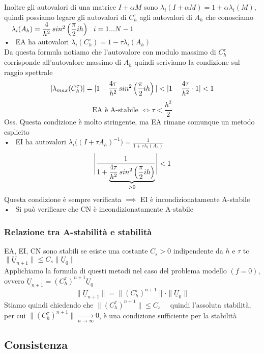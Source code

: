\documentclass{article}
\renewcommand{\vv}[1]{\underline{#1}}
\begin{document}
Inoltre gli autovalori di una matrice $I+\alpha M$ sono $\lambda_i(I+\alpha M)=1+\alpha \lambda_i(M)$, quindi possiamo legare gli autovalori di $C_h^{\tau}$ agli autovalori di $A_h$ che conosciamo \ \ $\lambda_i(A_h)=\dfrac{4}{h^2}\,sin^2\left(\dfrac{\pi}{2}ih\right) \ \ i=1...N-1$\\

• \ EA ha autovalori $\lambda_i(C_h^{\tau})=1-\tau\lambda_i(A_h)$\\
Da questa formula notiamo che l'autovalore con modulo massimo di $C_h^{\tau}$ corrisponde all'autovalore massimo di $A_h$ quindi scriviamo la condizione sul raggio spettrale
\[
|\lambda_{max}(C_h^{\tau})|=|1-\frac{4\tau}{h^2}\,sin^2\O\frac{\pi}{2}ih\C|<|1-\frac{4\tau}{h^2}\cdot 1|<1
\]
\[
\text{EA è A-stabile } \Longleftrightarrow \tau < \frac{h^2}{2}
\]
Oss. Questa condizione è molto stringente, ma EA rimane comunque un metodo esplicito\\


• \ EI ha autovalori $\lambda_i\big( (I+\tau A_h)^{-1} \big)=\frac{1}{1+\tau\lambda_i(A_h)}$
\[
\Bigg| \dfrac{1}{1+\underset{>0}{\underbrace{\dfrac{4\tau}{h^2}\,sin^2\left(\dfrac{\pi}{2}ih\right)}}} \Bigg|<1
\]
Questa condizione è sempre verificata $\implies $ EI è incondizionatamente A-stabile\\

• \ Si può verificare che CN è incondizionatamente A-stabile \\ 


\subsubsection*{Relazione tra A-stabilità e stabilità}


EA, EI, CN sono stabili se esiste una costante $C_s>0$ indipendente da $h$ e $\tau$ tc $\|\vv{U}_{n+1}\|\le C_s\|\vv{U}_0\|$\\
Applichiamo la formula di questi metodi nel caso del problema modello $(f=0)$, ovvero $\vv{U}_{n+1}=(C_h^{\tau})^{n+1}\vv{U}_0$
\[
\|\vv{U}_{n+1}\|=\|(C_h^{\tau})^{n+1}\|\cdot\|\vv{U}_0\|
\]
Stiamo quindi chiedendo che $\|(C_h^{\tau})^{n+1}\|\le C_s$ \ \ quindi l'assoluta stabilità, per cui $\|(C_h^{\tau})^{n+1}\|\xrightarrow[n\to\infty]{}0$, è una condizione sufficiente per la stabilità\\




\subsection{Consistenza}
\end{document}
